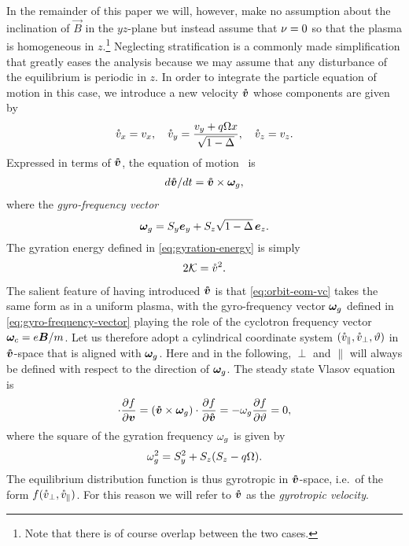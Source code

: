 \documentclass[aps,pre,notitlepage,amsmath,amssymb,amsfonts,nobibnotes,nofootinbib]{revtex4-1}
\begin{document}
In the remainder of this paper we will, however, make no assumption about the
inclination of $\vec{B}$ in the $yz$-plane but instead assume that $\nu=0$
so that the plasma is homogeneous in $z$.\footnote{Note that there is of
  course overlap between the two cases.} Neglecting stratification is a
commonly made simplification that greatly eases the analysis because we may
assume that any disturbance of the equilibrium is periodic in $z$. In order to
integrate the particle equation of motion in this case, we introduce a new
velocity $\bm{\mathring{v}}$ whose components are given by
\begin{equation}
  \label{eq:gyrotropic-velocity}
  \vc_x = v_x,\quad
  \vc_y = \frac{v_y + q\Omega x}{\sqrt{1-\Delta}},\quad
  \vc_z = v_z.
\end{equation}
Expressed in terms of $\bm{\mathring{v}}$, the equation of
motion~ is
\begin{align}
  \label{eq:orbit-eom-vc}
  d\vvc/dt = \vvc\times\vomg,
\end{align}
where the \emph{gyro-frequency vector}
\begin{equation}
  \label{eq:gyro-frequency-vector}
  \vomg = S_y\ey + S_z\sqrt{1-\Delta}\,\ez.
\end{equation}
The gyration energy defined in \cref{eq:gyration-energy} is simply
\begin{equation}
  \label{eq:gyration-energy-vc}
  2\mathcal{K} = \vc^2.
\end{equation}

The salient feature of having introduced $\bm{\mathring{v}}$ is that \cref{eq:orbit-eom-vc}
takes the same form as in a uniform plasma, with the gyro-frequency vector
$\bm{\omega}_g$ defined in \cref{eq:gyro-frequency-vector} playing the role of the
cyclotron frequency vector $\bm{\omega}_c=e\bm{B}/m$. Let us therefore adopt a
cylindrical coordinate system $(\mathring{v}_\parallel,\mathring{v}_\perp,\vartheta)$ in
$\bm{\mathring{v}}$-space that is aligned with $\bm{\omega}_g$. Here and in the following, $\perp$
and $\parallel$ will always be defined with respect to the direction of
$\bm{\omega}_g$. The steady state Vlasov equation is
\begin{equation}
  [(\vec{v} + q\Omega x\ey)\times\vec{S}]\cdot\pder{f}{\vec{v}}
  = (\vvc\times\vomg)\cdot\pder{f}{\vvc} = -\omg\pder{f}{\vartheta} = 0,
\end{equation}
where the square of the gyration frequency $\omega_g$ is given by
\begin{equation}
  \label{eq:gyro-frequency}
  \omg^2 = S_y^2 + S_z(S_z - q\Omega).
\end{equation}
The equilibrium distribution function is thus gyrotropic in $\bm{\mathring{v}}$-space,
i.e.\ of the form $f(\mathring{v}_\perp,\mathring{v}_\parallel)$. For this reason we will refer
to $\bm{\mathring{v}}$ as the \emph{gyrotropic velocity}.
\end{document}
